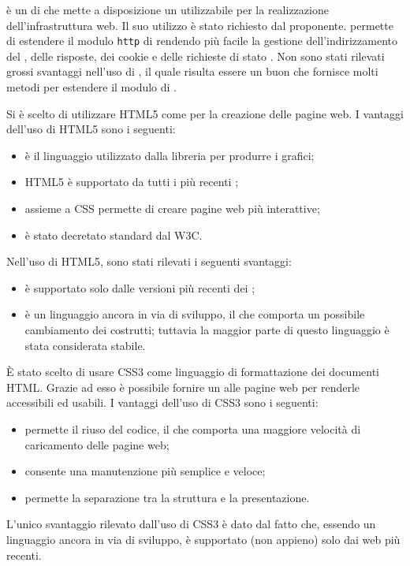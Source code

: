  è un  di  che mette a disposizione un  utilizzabile per la realizzazione dell'infrastruttura web. Il suo utilizzo è stato richiesto dal proponente.
 permette di estendere il modulo \texttt{http} di  rendendo più facile la gestione dell'indirizzamento del , delle risposte, dei cookie e delle richieste di stato .
Non sono stati rilevati grossi svantaggi nell'uso di , il quale risulta essere un buon  che fornisce molti metodi per estendere il modulo  di .

Si è scelto di utilizzare HTML5 come  per la creazione delle pagine web.
I vantaggi dell'uso di HTML5 sono i seguenti:
\begin{itemize}
\item è il linguaggio utilizzato dalla libreria  per produrre i grafici;
\item HTML5 è supportato da tutti i più recenti ;
\item assieme a CSS permette di creare pagine web più interattive;
\item è stato decretato standard dal W3C.
\end{itemize}
Nell'uso di HTML5, sono stati rilevati i seguenti svantaggi:
\begin{itemize}
\item è supportato solo dalle versioni più recenti dei ;
\item è un linguaggio ancora in via di sviluppo, il che comporta un possibile cambiamento dei costrutti; tuttavia la maggior parte di questo linguaggio è stata considerata stabile.
\end{itemize}

È stato scelto di usare CSS3 come linguaggio di formattazione dei documenti HTML. Grazie ad esso è possibile fornire un  alle pagine web per renderle accessibili ed usabili.
I vantaggi dell'uso di CSS3 sono i seguenti:
\begin{itemize}
\item permette il riuso del codice, il che comporta una maggiore velocità di caricamento delle pagine web;
\item consente una manutenzione più semplice e veloce;
\item permette la separazione tra la struttura e la presentazione.
\end{itemize}
L'unico svantaggio rilevato dall'uso di CSS3 è dato dal fatto che, essendo un linguaggio ancora in via di sviluppo, è supportato (non appieno) solo dai web  più recenti.

